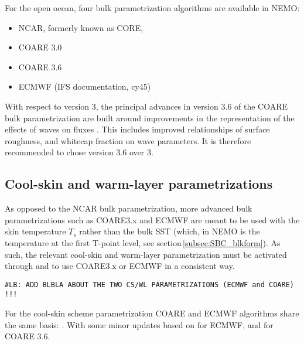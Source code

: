 \documentclass[../main/NEMO_manual]{subfiles}
\begin{document}
For the open ocean, four bulk parametrization algorithms are available in NEMO:
\begin{itemize}
\item NCAR, formerly known as CORE, \citep{large.yeager_rpt04,large.yeager_CD09}
\item COARE 3.0 \citep{fairall.bradley.ea_JC03}
\item COARE 3.6 \citep{edson.jampana.ea_JPO13}
\item ECMWF (IFS documentation, cy45)
\end{itemize}


With respect to version 3, the principal advances in version 3.6 of the COARE
bulk parametrization are built around improvements in the representation of the
effects of waves on
fluxes \citep{edson.jampana.ea_JPO13,brodeau.barnier.ea_JPO17}. This includes
improved relationships of surface roughness, and whitecap fraction on wave
parameters. It is therefore recommended to chose version 3.6 over 3.




\subsection{Cool-skin and warm-layer parametrizations}\label{subsec:SBC_skin}
%
As opposed to the NCAR bulk parametrization, more advanced bulk
parametrizations such as COARE3.x and ECMWF are meant to be used with the skin
temperature $T_s$ rather than the bulk SST (which, in NEMO is the temperature at
the first T-point level, see section\,\ref{subsec:SBC_blkform}).
%
As such, the relevant cool-skin and warm-layer parametrization must be
activated through 
and  to use COARE3.x or ECMWF in a consistent
way.

\texttt{\#LB: ADD BLBLA ABOUT THE TWO CS/WL PARAMETRIZATIONS (ECMWF and COARE) !!!}

For the cool-skin scheme parametrization COARE and ECMWF algorithms share the same
basis: \citet{fairall.bradley.ea_JGR96}. With some minor updates based
on \citet{zeng.beljaars_GRL05} for ECMWF, and \citet{fairall.ea_19} for COARE
3.6.
\end{document}
